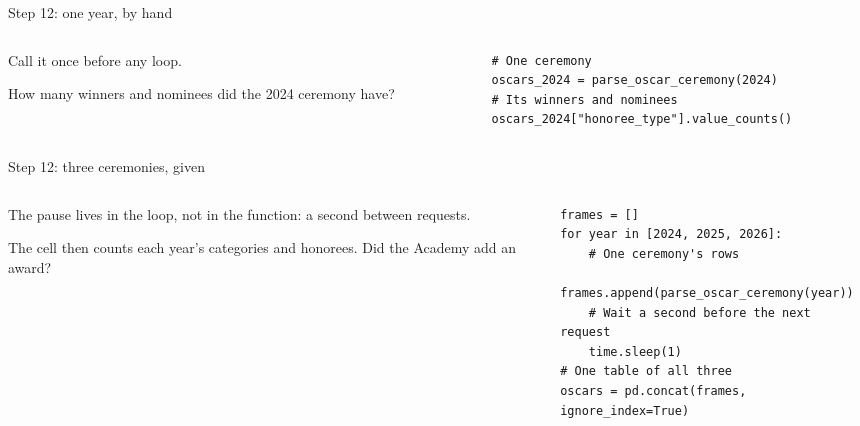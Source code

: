 \documentclass[9pt,aspectratio=169]{beamer}
\begin{document}
\begin{frame}[fragile]{Step 12: one year, by hand}
    \begin{columns}[T]
        \begin{column}{0.37\textwidth}
            Call it once before any loop.

            \medskip
            How many winners and nominees did the 2024 ceremony have?
        \end{column}
        \begin{column}{0.6\textwidth}
\begin{lstlisting}
# One ceremony
oscars_2024 = parse_oscar_ceremony(2024)
# Its winners and nominees
oscars_2024["honoree_type"].value_counts()
\end{lstlisting}
        \end{column}
    \end{columns}
\end{frame}

\begin{frame}[fragile]{Step 12: three ceremonies, given}
    \begin{columns}[T]
        \begin{column}{0.37\textwidth}
            The pause lives in the loop, not in the function: a second between requests.

            \medskip
            The cell then counts each year's categories and honorees. Did the Academy add an award?
        \end{column}
        \begin{column}{0.6\textwidth}
\begin{lstlisting}
frames = []
for year in [2024, 2025, 2026]:
    # One ceremony's rows
    frames.append(parse_oscar_ceremony(year))
    # Wait a second before the next request
    time.sleep(1)
# One table of all three
oscars = pd.concat(frames, ignore_index=True)
\end{lstlisting}
        \end{column}
    \end{columns}
\end{frame}
\end{document}
